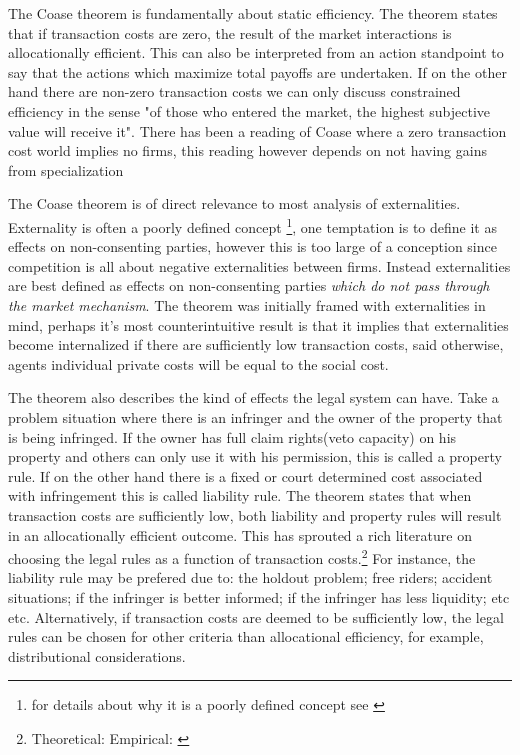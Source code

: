 \documentclass[12pt]{article}
\numberwithin{equation}{section}
\begin{document}
The Coase theorem is fundamentally about static efficiency. The theorem states that if transaction costs are zero, the result of the market interactions is allocationally efficient. This can also be interpreted from an action standpoint to say that the actions which maximize total payoffs are undertaken. If on the other hand there are non-zero transaction costs we can only discuss constrained efficiency in the sense "of those who entered the market, the highest subjective value will receive it". There has been a reading of Coase where a zero transaction cost world implies no firms, this reading however depends on not having gains from specialization \cite{demsetz2011rh}

The Coase theorem is of direct relevance to most analysis of externalities. Externality is often a poorly defined concept \footnote{for details about why it is a poorly defined concept see \cite{Cheung1970}}, one temptation is to define it as effects on non-consenting parties, however this is too large of a conception since competition is all about negative externalities between firms. Instead externalities are best defined as effects on non-consenting parties \textit{which do not pass through the market mechanism}. The theorem was initially framed with externalities in mind, perhaps it's most counterintuitive result is that it implies that externalities become internalized if there are sufficiently low transaction costs, said otherwise, agents individual private costs will be equal to the social cost. 

The theorem also describes the kind of effects the legal system can have. Take a problem situation where there is an infringer and the owner of the property that is being infringed. If the owner has full claim rights(veto capacity) on his property and others can only use it with his permission, this is called a property rule. If on the other hand there is a fixed or court determined cost associated with infringement this is called liability rule. The theorem states that when transaction costs are sufficiently low, both liability and property rules will result in an allocationally efficient outcome. This has sprouted a rich literature on choosing the legal rules as a function of transaction costs.\footnote{Theoretical: \cite{calabresi1972property} Empirical: \cite{kaplow1995property}} For instance, the liability rule may be prefered due to: the holdout problem; free riders; accident situations; if the infringer is better informed; if the infringer has less liquidity; etc etc. Alternatively, if transaction costs are deemed to be sufficiently low, the legal rules can be chosen for other criteria than allocational efficiency, for example, distributional considerations. 
\end{document}
